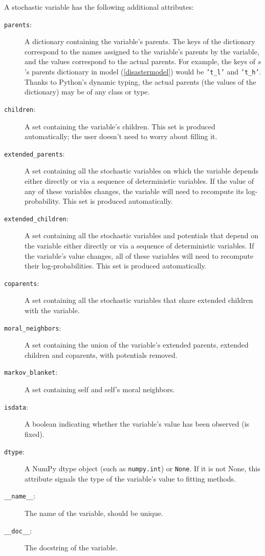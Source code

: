 A stochastic variable has the following additional attributes:
\begin{description}
    \item[\texttt{parents}:] A dictionary containing the variable's parents. The keys of the dictionary correspond to the names assigned to the variable's parents by the variable, and the values correspond to the actual parents. For example, the keys of $s$'s parents dictionary in model (\ref{disastermodel}) would be \texttt{'t_l'} and \texttt{'t_h'}. Thanks to Python's dynamic typing, the actual parents (the values of the dictionary) may be of any class or type.
    \item[\texttt{children}:] A set containing the variable's children. This set is produced automatically; the user doesn't need to worry about filling it.
    \item[\texttt{extended_parents}:] A set containing all the stochastic variables on which the variable depends either directly or via a sequence of deterministic variables. If the value of any of these variables changes, the variable will need to recompute its log-probability. This set is produced automatically.
    \item[\texttt{extended_children}:] A set containing all the stochastic variables and potentials that depend on the variable either directly or via a sequence of deterministic variables. If the variable's value changes, all of these variables will need to recompute their log-probabilities. This set is produced automatically.
    \item[\texttt{coparents}:] A set containing all the stochastic variables that share extended children with the variable.
    \item[\texttt{moral_neighbors}:] A set containing the union of the variable's extended parents, extended children and coparents, with potentials removed.
    \item[\texttt{markov_blanket}:] A set containing self and self's moral neighbors.
    \item[\texttt{isdata}:] A boolean indicating whether the variable's value has been observed (is fixed).
    \item[\texttt{dtype}:] A NumPy dtype object (such as \texttt{numpy.int}) or \texttt{None}. If it is not None, this attribute signals the type of the variable's value to fitting methods.
    \item[\texttt{__name__}:] The name of the variable, should be unique.
    \item[\texttt{__doc__}:] The docstring of the variable.
\end{description}

